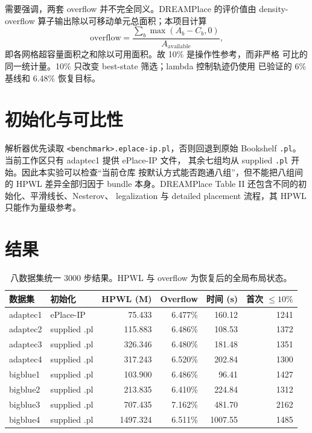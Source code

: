 \documentclass[11pt,a4paper]{ctexart}
\begin{document}
需要强调，两套 overflow 并不完全同义。DREAMPlace 的评价值由
density-overflow 算子输出除以可移动单元总面积；本项目计算
\[
  \mathrm{overflow}=
  \frac{\sum_b\max(A_b-C_b,0)}{A_{\mathrm{available}}},
\]
即各网格超容量面积之和除以可用面积。故 10\% 是操作性参考，而非严格
可比的同一统计量。10\% 只改变 best-state 筛选；lambda 控制轨迹仍使用
已验证的 6\% 基线和 6.48\% 恢复目标。

\section{初始化与可比性}

解析器优先读取 \texttt{<benchmark>.eplace-ip.pl}，否则回退到原始
Bookshelf \texttt{.pl}。当前工作区只有 adaptec1 提供 ePlace-IP 文件，
其余七组均从 supplied \texttt{.pl} 开始。因此本实验可以检查“当前仓库
按默认方式能否跑通八组”，但不能把八组间的 HPWL 差异全部归因于 bundle
本身。DREAMPlace Table II 还包含不同的初始化、平滑线长、Nesterov、
legalization 与 detailed placement 流程，其 HPWL 只能作为量级参考。

\section{结果}

\begin{table}[H]
\centering
\small
\caption{八数据集统一 3000 步结果。HPWL 与 overflow 为恢复后的全局布局状态。}
\begin{tabular}{l l r r r r}
\toprule
数据集 & 初始化 & HPWL (M) & Overflow & 时间 (s) & 首次 $\leq10\%$ \\
\midrule
adaptec1 & ePlace-IP & 75.433 & 6.477\% & 160.12 & 1241 \\
adaptec2 & supplied .pl & 115.883 & 6.486\% & 108.53 & 1372 \\
adaptec3 & supplied .pl & 326.346 & 6.480\% & 181.48 & 1351 \\
adaptec4 & supplied .pl & 317.243 & 6.520\% & 202.84 & 1300 \\
bigblue1 & supplied .pl & 103.900 & 6.486\% & 96.41 & 1427 \\
bigblue2 & supplied .pl & 213.835 & 6.410\% & 224.84 & 1312 \\
bigblue3 & supplied .pl & 707.435 & 7.162\% & 481.70 & 2162 \\
bigblue4 & supplied .pl & 1497.324 & 6.511\% & 1007.55 & 1485 \\
\bottomrule
\end{tabular}
\end{table}
\end{document}
